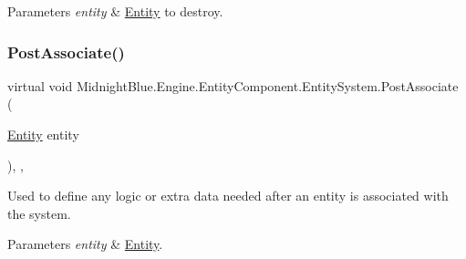 \begin{DoxyParams}{Parameters}
{\em entity} & \hyperlink{class_midnight_blue_1_1_engine_1_1_entity_component_1_1_entity}{Entity} to destroy.\\
\hline
\end{DoxyParams}
\hypertarget{class_midnight_blue_1_1_engine_1_1_entity_component_1_1_entity_system_a1b4c3640c70033dd99ec707e0546168b}{}\label{class_midnight_blue_1_1_engine_1_1_entity_component_1_1_entity_system_a1b4c3640c70033dd99ec707e0546168b} 
\subsubsection{\texorpdfstring{Post\+Associate()}{PostAssociate()}}
{\footnotesize\ttfamily virtual void Midnight\+Blue.\+Engine.\+Entity\+Component.\+Entity\+System.\+Post\+Associate (\begin{DoxyParamCaption}\item[{\hyperlink{class_midnight_blue_1_1_engine_1_1_entity_component_1_1_entity}{Entity}}]{entity }\end{DoxyParamCaption})\hspace{0.3cm}{\ttfamily [inline]}, {\ttfamily [protected]}, {\ttfamily [virtual]}}



Used to define any logic or extra data needed after an entity is associated with the system. 


\begin{DoxyParams}{Parameters}
{\em entity} & \hyperlink{class_midnight_blue_1_1_engine_1_1_entity_component_1_1_entity}{Entity}.\\
\hline
\end{DoxyParams}
\hypertarget{class_midnight_blue_1_1_engine_1_1_entity_component_1_1_entity_system_a65ff1877a5212e339f03e5c098976a80}{}\label{class_midnight_blue_1_1_engine_1_1_entity_component_1_1_entity_system_a65ff1877a5212e339f03e5c098976a80} 
